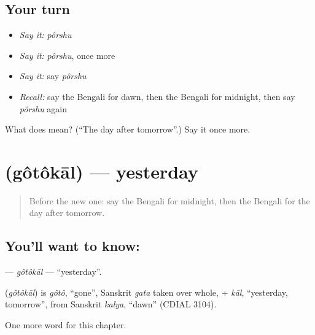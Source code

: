 \subsection*{Your turn}
\begin{itemize}
\raggedright
  \item \emph{Say it:} \emph{pôrshu}
  \item \emph{Say it:} \emph{pôrshu}, once more
  \item \emph{Say it:} say \emph{pôrshu}
  \item \emph{Recall:} say the Bengali for dawn, then the Bengali for midnight, then say \emph{pôrshu} again
\end{itemize}

\begin{tcolorbox}[breakable,colback=teal!4,colframe=teal!35!black,title={Before you move on}]
What does  mean? (\textquotedblleft{}The day after tomorrow\textquotedblright{}.) Say it once more.
\end{tcolorbox}
\section[\texorpdfstring{\bn{গতকাল} (gôtôkāl)}{গতকাল (gôtôkāl)}]{ (gôtôkāl) — yesterday}

\label{lesson:BN-C90-gotokal}



\begin{quote}
Before the new one: say the Bengali for midnight, then the Bengali for the day after tomorrow.
\end{quote}

\subsection*{You'll want to know: }
\textbf{} — \emph{gôtôkāl} — \textquotedblleft{}yesterday\textquotedblright{}.

\begin{cousinweb}
\textbf{} (\emph{gôtôkāl}) is \emph{gôtô}, \textquotedblleft{}gone\textquotedblright{}, Sanskrit \emph{gata} taken over whole, + \emph{kāl}, \textquotedblleft{}yesterday, tomorrow\textquotedblright{}, from Sanskrit \emph{kalya}, \textquotedblleft{}dawn\textquotedblright{} (CDIAL 3104).
\end{cousinweb}

\begin{grammarlens}[title={What you've built}]
One more word for this chapter.
\end{grammarlens}


